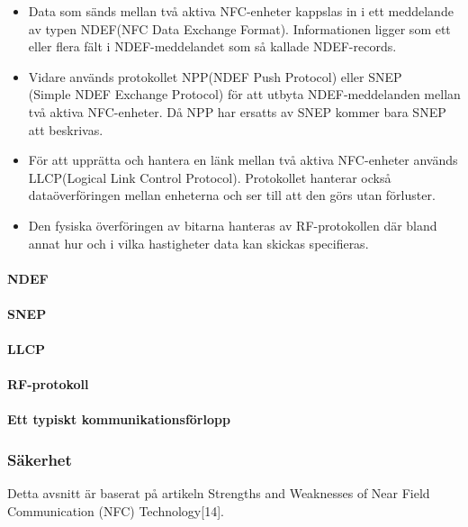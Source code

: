 \documentclass[11pt]{article}
\begin{document}
\begin{itemize}
\item Data som sänds mellan två aktiva NFC-enheter kappslas in i ett meddelande av typen NDEF(NFC Data Exchange Format). Informationen ligger som ett eller flera fält i NDEF-meddelandet som så kallade NDEF-records. 

\item Vidare används protokollet NPP(NDEF Push Protocol) eller SNEP\\(Simple NDEF Exchange Protocol) för att utbyta NDEF-meddelanden mellan två aktiva NFC-enheter. Då NPP har ersatts av SNEP kommer bara SNEP att beskrivas.

\item För att upprätta och hantera en länk mellan två aktiva NFC-enheter används LLCP(Logical Link Control Protocol). Protokollet hanterar också dataöverföringen mellan enheterna och ser till att den görs utan förluster.

\item Den fysiska överföringen av bitarna hanteras av RF-protokollen där bland annat hur och i vilka hastigheter data kan skickas specifieras.

\end{itemize}


\paragraph{NDEF}


\paragraph{SNEP}


\paragraph{LLCP}


\paragraph{RF-protokoll}


\paragraph{Ett typiskt kommunikationsförlopp}


\subsubsection{Säkerhet}
Detta avsnitt är baserat på artikeln Strengths and Weaknesses of Near Field Communication (NFC) Technology[14].
\end{document}
